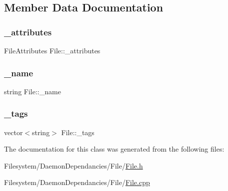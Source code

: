 \subsection{Member Data Documentation}
\mbox{\label{class_file_ae2faf26750f73c5848cf414f208282b2}} 
\subsubsection{\texorpdfstring{\+\_\+attributes}{\_attributes}}
{\footnotesize\ttfamily File\+Attributes File\+::\+\_\+attributes\hspace{0.3cm}{\ttfamily [private]}}

\mbox{\label{class_file_a9668b6d84f8f57a737e30d87f08725cd}} 
\subsubsection{\texorpdfstring{\+\_\+name}{\_name}}
{\footnotesize\ttfamily string File\+::\+\_\+name\hspace{0.3cm}{\ttfamily [private]}}

\mbox{\label{class_file_aa4bc599b81fee53fd7b7b9d7f8129e11}} 
\subsubsection{\texorpdfstring{\+\_\+tags}{\_tags}}
{\footnotesize\ttfamily vector$<$string$>$ File\+::\+\_\+tags\hspace{0.3cm}{\ttfamily [private]}}



The documentation for this class was generated from the following files\+:\begin{DoxyCompactItemize}
\item 
Filesystem/\+Daemon\+Dependancies/\+File/\mbox{\hyperlink{_file_8h}{File.\+h}}\item 
Filesystem/\+Daemon\+Dependancies/\+File/\mbox{\hyperlink{_file_8cpp}{File.\+cpp}}\end{DoxyCompactItemize}
